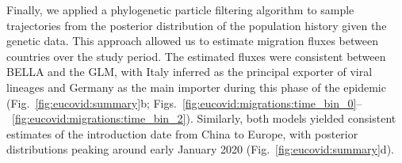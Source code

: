 Finally, we applied a phylogenetic particle filtering algorithm \cite{vaughan2019estimating} to sample trajectories from the posterior distribution of the population history given the genetic data.
This approach allowed us to estimate migration fluxes between countries over the study period.
The estimated fluxes were consistent between BELLA and the GLM, with Italy inferred as the principal exporter of viral lineages and Germany as the main importer during this phase of the epidemic (Fig.~\ref{fig:eucovid:summary}b; Figs.~\ref{fig:eucovid:migrations:time_bin_0}--~\ref{fig:eucovid:migrations:time_bin_2}).
Similarly, both models yielded consistent estimates of the introduction date from China to Europe, with posterior distributions peaking around early January 2020 (Fig.~\ref{fig:eucovid:summary}d).
